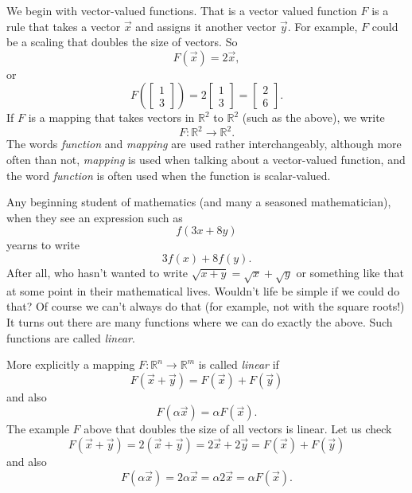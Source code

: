 We begin with vector-valued functions.  That is a vector valued function
$F$ is a rule that takes a vector $\vec{x}$ and assigns it another vector
$\vec{y}$.  For example, $F$ could be a scaling that doubles the size of
vectors.  So
\begin{equation*}
F(\vec{x}) = 2 \vec{x} ,
\end{equation*}
or
\begin{equation*}
F
\left( \begin{bmatrix} 1 \\ 3 \end{bmatrix} \right)
=
2
\begin{bmatrix} 1 \\ 3 \end{bmatrix}
=
\begin{bmatrix} 2 \\ 6 \end{bmatrix} .
\end{equation*}
If $F$ is a mapping that takes vectors in
${\mathbb R}^2$ to 
${\mathbb R}^2$ (such as the above), we write
\begin{equation*}
F \colon {\mathbb R}^2 \to {\mathbb R}^2 .
\end{equation*}
The words \emph{function} and \emph{mapping} are used rather interchangeably,
although more often than not, \emph{mapping} is used when talking about a
vector-valued function, and the word \emph{function} is often used when the
function is scalar-valued.

Any beginning student of mathematics (and many a seasoned mathematician),
when they see an expression such as
\begin{equation*}
f(3x+8y)
\end{equation*}
yearns to write
\begin{equation*}
3f(x)+8f(y) .
\end{equation*}
After all, who hasn't wanted to write $\sqrt{x+y} = \sqrt{x} + \sqrt{y}$ or
something like that at some point in their mathematical lives.
Wouldn't life be simple if we could do that?
Of course we can't always do that (for example, not with the square roots!)
It turns out there are many functions where
we can do exactly the above.  Such functions are called \emph{linear}.

More explicitly a mapping $F \colon {\mathbb R}^n \to {\mathbb R}^m$
is called \emph{linear} if
\begin{equation*}
F(\vec{x}+\vec{y}) = F(\vec{x})+F(\vec{y})
\end{equation*}
and also
\begin{equation*}
F(\alpha \vec{x}) = \alpha F(\vec{x}) .
\end{equation*}
The example $F$ above that doubles the size of all vectors is linear.  Let
us check
\begin{equation*}
F(\vec{x}+\vec{y})
=
2(\vec{x}+\vec{y})
=
2\vec{x}+2\vec{y}
=
F(\vec{x})+F(\vec{y})
\end{equation*}
and also
\begin{equation*}
F(\alpha \vec{x}) = 2 \alpha \vec{x} = \alpha 2 \vec{x} = \alpha F(\vec{x}) .
\end{equation*}

